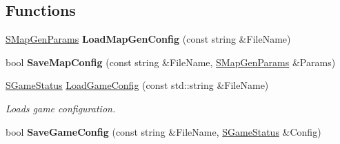 \subsection*{Functions}
\begin{DoxyCompactItemize}
\item 
\hypertarget{namespace_chase_game_a4779af792d3de8e274049bf2019e0343}{\hyperlink{struct_chase_game_1_1_s_map_gen_params}{S\-Map\-Gen\-Params} {\bfseries Load\-Map\-Gen\-Config} (const string \&File\-Name)}\label{namespace_chase_game_a4779af792d3de8e274049bf2019e0343}

\item 
\hypertarget{namespace_chase_game_a98e8d90127c802c1445266e39966c3fb}{bool {\bfseries Save\-Map\-Config} (const string \&File\-Name, \hyperlink{struct_chase_game_1_1_s_map_gen_params}{S\-Map\-Gen\-Params} \&Params)}\label{namespace_chase_game_a98e8d90127c802c1445266e39966c3fb}

\item 
\hyperlink{struct_chase_game_1_1_s_game_status}{S\-Game\-Status} \hyperlink{namespace_chase_game_addd460052ec5a5fe3010665ca84b07ec}{Load\-Game\-Config} (const std\-::string \&File\-Name)
\begin{DoxyCompactList}\small\item\em Loads game configuration. \end{DoxyCompactList}\item 
\hypertarget{namespace_chase_game_a39f8b039151b1a3eef82fdc1c6f52091}{bool {\bfseries Save\-Game\-Config} (const string \&File\-Name, \hyperlink{struct_chase_game_1_1_s_game_status}{S\-Game\-Status} \&Config)}\label{namespace_chase_game_a39f8b039151b1a3eef82fdc1c6f52091}


\end{DoxyCompactItemize}
